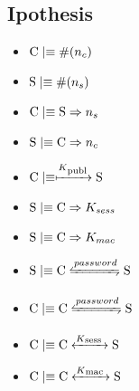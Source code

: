 \subsection{Ipothesis}
\begin{itemize}
	\item \(\textnormal{C} \mid\equiv \#(n_c)\)
	\item \(\textnormal{S} \mid\equiv \#(n_s)\)
	\item \(\textnormal{C} \mid\equiv \textnormal{S} \Rightarrow n_s\)
	\item \(\textnormal{S} \mid\equiv \textnormal{C} \Rightarrow n_c\)
	\item \(\textnormal{C} \mid\equiv \xmapsto{K\textsubscript{publ}} \textnormal{S}\)
	\item \(\textnormal{S} \mid\equiv \textnormal{C} \Rightarrow K_{sess}\)
	\item \(\textnormal{S} \mid\equiv \textnormal{C} \Rightarrow K_{mac}\)
	\item \(\textnormal{S} \believes \textnormal{C} \secret{password} \textnormal{S}\)
	\item \(\textnormal{C} \believes \textnormal{C} \secret{password} \textnormal{S}\)
	\item \(\textnormal{C} \mid\equiv \textnormal{C} \xleftrightarrow{K\textsubscript{sess }} \textnormal{S}\)
	\item \(\textnormal{C} \mid\equiv \textnormal{C} \xleftrightarrow{K\textsubscript{mac }} \textnormal{S}\)
\end{itemize}

